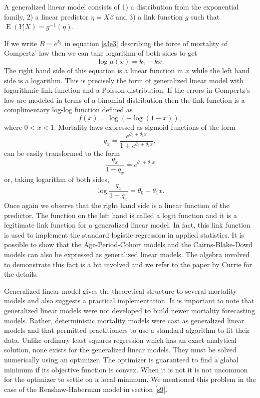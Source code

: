 \documentclass{article}
\numberwithin{equation}{section}
\DeclareMathOperator{\E}{E}
\begin{document}
A generalized linear model consists of 1) a distribution from the exponential
family, 2) a linear predictor $\eta = X\beta$ and 3) a link function $g$
such that $\E(Y|X) = g^{-1}(\eta)$.

If we write $B = e^{k_1}$ in equation \eqref{s3e3} describing the force of
mortality of Gompertz' law then we can take logarithm of both sides to get
\begin{equation}\label{e12e2}
\log\mu(x) = k_1 + kx.
\end{equation}
The right hand side of this equation is a linear function in $x$ while the left
hand side is a logarithm. This is precisely the form of generalized linear
model with logarithmic link function and a Poisson distribution. If the errors
in Gompertz's law are modeled in terms of a binomial distribution then the
link function is a complimentary log-log function \cite{currie2013fitting} 
defined as
\begin{equation}\label{e12e3}
f(x) = \log(-\log(1 - x)),
\end{equation}
where $0 < x < 1$. Mortality laws expressed as sigmoid functions of the form
\begin{equation}\label{e12e4}
q_x = \frac{e^{\theta_0 + \theta_1 x}}{1 + e^{\theta_0 + \theta_1 x}},
\end{equation}
can be easily transformed to the form
\begin{equation}\label{e12e5}
\frac{q_x}{1 - q_x} = e^{\theta_0 + \theta_1 x}
\end{equation}
or, taking logarithm of both sides,
\begin{equation}\label{e12e6}
\log\frac{q_x}{1 - q_x} = \theta_0 + \theta_1 x.
\end{equation}
Once again we observe that the right hand side is a linear function of the
predictor. The function on the left hand is called a logit function and it is
a legitimate link function for a generalized linear model. In fact, this link
function is used to implement the standard logistic regression in applied
statistics. It is possible to show that the Age-Period-Cohort models and the
Cairns-Blake-Dowd models can also be expressed as generalized linear models. 
The algebra involved to demonstrate this fact is a bit involved and we refer
to the paper by Currie \cite{currie2013fitting} for the details.

Generalized linear model gives the theoretical structure to several mortality
models and also suggests a practical implementation. It is important to note
that generalized linear models were not developed to build newer mortality
forecasting models. Rather, deterministic mortality models were cast as 
generalized linear models and that permitted practitioners to use a standard
algorithm to fit their data. Unlike ordinary least squares regression which
has an exact analytical solution, none exists for the generalized linear models.
They must be solved numerically using an optimizer. The optimizer is guaranteed
to find a global minimum if its objective function is convex. When it is not
it is not uncommon for the optimizer to settle on a local minimum. We mentioned
this problem in the case of the Renshaw-Haberman model in section \ref{s9}.
\end{document}
